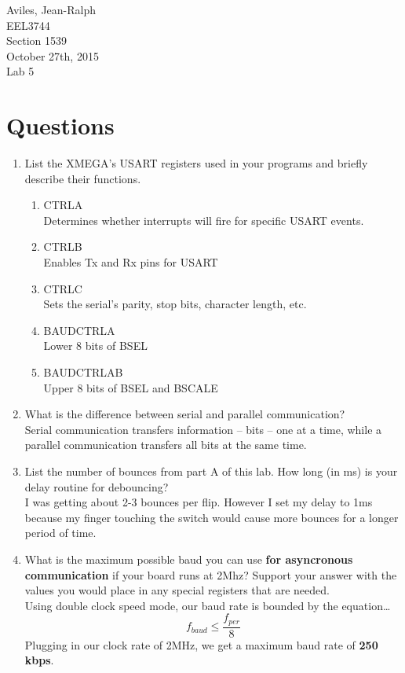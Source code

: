 \documentclass[letterpaper, 12pt]{article}
\newcommand{\hwnumber}{Lab 5}
\newcommand{\duedate}{October 27th, 2015}
\newcommand{\capper}{\begin{flushright}Aviles, Jean-Ralph \\ EEL3744 \\ Section 1539 \\ \duedate{} \\ \hwnumber{}\end{flushright}}
\begin{document}
\capper{}
\section*{Questions}
\begin{enumerate}
  \item List the XMEGA's USART registers used in your programs and briefly describe their functions.
  \begin{enumerate}
    \item CTRLA \\
      \hspace*{8pt} Determines whether interrupts will fire for specific USART events.
    \item CTRLB \\
      \hspace*{8pt} Enables Tx and Rx pins for USART
    \item CTRLC \\
      \hspace*{8pt} Sets the serial's parity, stop bits, character length, etc.
    \item BAUDCTRLA \\
      \hspace*{8pt} Lower 8 bits of BSEL
    \item BAUDCTRLAB \\
      \hspace*{8pt} Upper 8 bits of BSEL and BSCALE
  \end{enumerate}
  \item What is the difference between serial and parallel communication? \\
    \hspace*{8pt} Serial communication transfers information -- bits -- one at a time, while a parallel communication transfers all bits at the same time.
  \item List the number of bounces from part A of this lab. How long (in ms) is your delay routine for debouncing? \\
    \hspace*{8pt} I was getting about 2-3 bounces per flip. However I set my delay to 1ms because my finger touching the switch would cause more bounces for a longer period of time.
  \item What is the maximum possible baud you can use \textbf{for asyncronous communication} if your board runs at 2Mhz? Support your answer with the values you would place in any special registers that are needed. \\
    \hspace*{8pt} Using double clock speed mode, our baud rate is bounded by the equation\ldots \[ f_{baud} \leq \frac{f_{per}}{8} \] Plugging in our clock rate of 2MHz, we get a maximum baud rate of \textbf{250 kbps}.
\end{enumerate}
\end{document}
